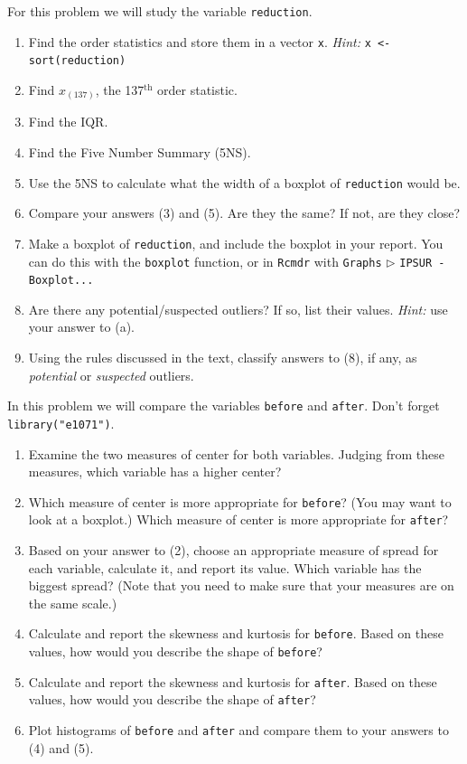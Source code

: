 \documentclass[10pt,english]{scrbook}
\begin{document}
\begin{xca}
For this problem we will study the variable \texttt{reduction}.
\begin{enumerate}
\item Find the order statistics and store them in a vector \texttt{x}. \emph{Hint:} \texttt{x <- sort(reduction)}
\item Find \(x_{(137)}\), the 137\(^{\mathrm{th}}\) order statistic.
\item Find the IQR.
\item Find the Five Number Summary (5NS).
\item Use the 5NS to calculate what the width of a boxplot of \texttt{reduction} would be.
\item Compare your answers (3) and (5). Are they the same? If not, are they close?
\item Make a boxplot of \texttt{reduction}, and include the boxplot in your report. You can do this with the \texttt{boxplot} function, or in \texttt{Rcmdr} with \texttt{Graphs} \(\triangleright\) \texttt{IPSUR - Boxplot...}
\item Are there any potential/suspected outliers? If so, list their values. \emph{Hint:} use your answer to (a).
\item Using the rules discussed in the text, classify answers to (8), if any, as \emph{potential} or \emph{suspected} outliers.
\end{enumerate}
\end{xca}

\begin{xca}
In this problem we will compare the variables \texttt{before} and \texttt{after}. Don't forget \texttt{library("e1071")}.
\begin{enumerate}
\item Examine the two measures of center for both variables. Judging from these measures, which variable has a higher center?
\item Which measure of center is more appropriate for \texttt{before}? (You may want to look at a boxplot.) Which measure of center is more appropriate for \texttt{after}?
\item Based on your answer to (2), choose an appropriate measure of spread for each variable, calculate it, and report its value. Which variable has the biggest spread? (Note that you need to make sure that your measures are on the same scale.)
\item Calculate and report the skewness and kurtosis for \texttt{before}. Based on these values, how would you describe the shape of \texttt{before}?
\item Calculate and report the skewness and kurtosis for \texttt{after}. Based on these values, how would you describe the shape of \texttt{after}?
\item Plot histograms of \texttt{before} and \texttt{after} and compare them to your answers to (4) and (5).
\end{enumerate}
\end{xca}
\end{document}
